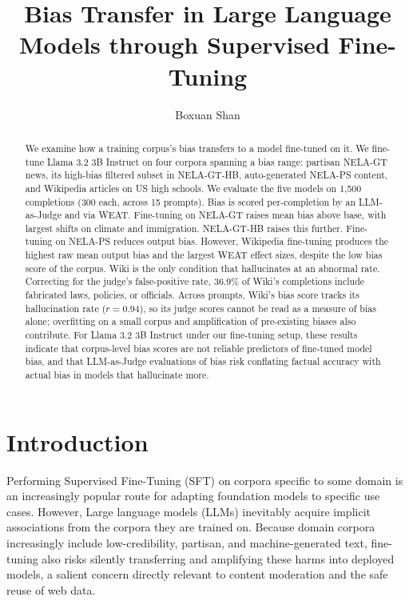 \documentclass[11pt]{article}
\title{Bias Transfer in Large Language Models through Supervised Fine-Tuning}
\author{Boxuan Shan}
\date{}
\begin{document}
\maketitle

\begin{abstract}

  We examine how a training corpus's bias transfers to a model fine-tuned on it. 
  We fine-tune Llama 3.2 3B Instruct on four corpora spanning a bias range: partisan NELA-GT news, its high-bias filtered subset in NELA-GT-HB, auto-generated NELA-PS content, and Wikipedia articles on US high schools.
  We evaluate the five models on 1{,}500 completions (300 each, across 15 prompts).
  Bias is scored per-completion by an LLM-as-Judge and via WEAT.
  Fine-tuning on NELA-GT raises mean bias above base, with largest shifts on climate and immigration.
  NELA-GT-HB raises this further.
  Fine-tuning on NELA-PS reduces output bias. 
  However, Wikipedia fine-tuning produces the highest raw mean output bias and the largest WEAT effect sizes, despite the low bias score of the corpus.
  Wiki is the only condition that hallucinates at an abnormal rate. 
  Correcting for the judge's false-positive rate, $36.9\%$ of Wiki's completions include fabricated laws, policies, or officials. 
  Across prompts, Wiki's bias score tracks its hallucination rate ($r = 0.94$), so its judge scores cannot be read as a measure of bias alone; overfitting on a small corpus and amplification of pre-existing biases also contribute.
  For Llama 3.2 3B Instruct under our fine-tuning setup, these results indicate that corpus-level bias scores are not reliable predictors of fine-tuned model bias, and that LLM-as-Judge evaluations of bias risk conflating factual accuracy with actual bias in models that hallucinate more.

\end{abstract}

\section{Introduction}

Performing Supervised Fine-Tuning (SFT) on corpora specific to some domain is an increasingly popular route for adapting foundation models to specific use cases.
However, Large language models (LLMs) inevitably acquire implicit associations from the corpora they are trained on. 
Because domain corpora increasingly include low-credibility, partisan, and machine-generated text, fine-tuning also risks silently transferring and amplifying these harms into deployed models, a salient concern directly relevant to content moderation and the safe reuse of web data.
\end{document}
